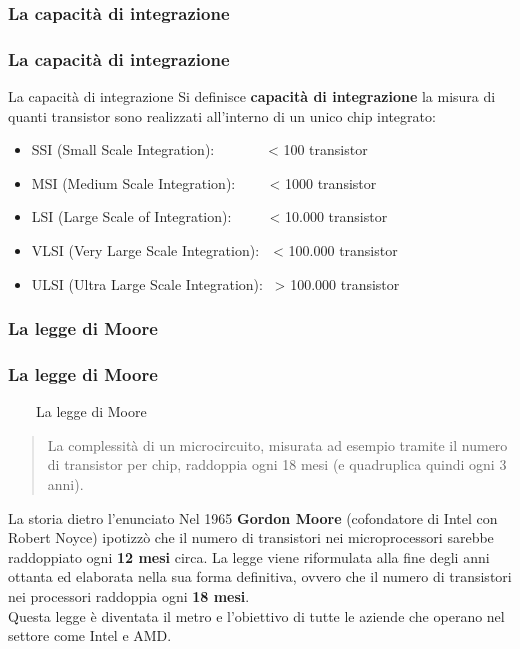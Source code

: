 \subsubsection[La capacità di integrazione]{La capacità di integrazione}
\begin{frame}
	\frametitle{La capacità di integrazione}
	
	\begin{block}{La capacità di integrazione}
		Si definisce \textbf{capacità di integrazione} la misura di quanti transistor sono realizzati all'interno di un unico chip integrato:
		\begin{itemize}
			\item SSI (Small Scale Integration): $\qquad\quad\,$ < 100 transistor
			\item MSI (Medium Scale Integration): $\quad\;\;\:$ < 1000 transistor
			\item LSI (Large Scale of Integration): $\quad\;\;\,\,\,$ < 10.000 transistor
			\item VLSI (Very Large Scale Integration): $\,\,$ < 100.000 transistor
			\item ULSI (Ultra Large Scale Integration): $\,$ > 100.000 transistor
		\end{itemize}
		
	\end{block}
	
\end{frame}


\subsubsection[La legge di Moore]{La legge di Moore}
\begin{frame}
	\frametitle{La legge di Moore}
	
	\begin{block}{$\qquad$La legge di Moore}
		\begin{quote}
			La complessità di un microcircuito, misurata ad esempio tramite il numero di transistor per chip, raddoppia ogni 18 mesi (e quadruplica quindi ogni 3 anni).
		\end{quote}		
	\end{block}
	
	\pause
	
	\begin{block}{La storia dietro l'enunciato}
		Nel 1965 \textbf{Gordon Moore} (cofondatore di Intel con Robert Noyce) ipotizzò che il numero di transistori nei microprocessori sarebbe raddoppiato ogni \textbf{12 mesi} circa. 	La legge viene riformulata alla fine degli anni ottanta ed elaborata nella sua forma definitiva, ovvero che il numero di transistori nei processori raddoppia ogni \textbf{18 mesi}.\\
		Questa legge è diventata il metro e l'obiettivo di tutte le aziende che operano nel settore come Intel e AMD.
	\end{block}
	
\end{frame}


